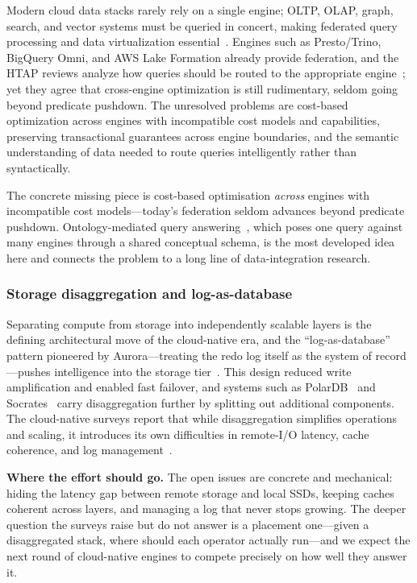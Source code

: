 \documentclass[a4paper,fleqn]{cas-sc}
\begin{document}
Modern cloud data stacks rarely rely on a single engine; OLTP, OLAP, graph, search, and vector systems must be queried in concert, making federated query processing and data virtualization essential~\cite{Haas2024HTAPSurvey,Sheng2025MQRLD}. Engines such as Presto/Trino, BigQuery Omni, and AWS Lake Formation already provide federation, and the HTAP reviews analyze how queries should be routed to the appropriate engine~\cite{Haas2024HTAPSurvey}; yet they agree that cross-engine optimization is still rudimentary, seldom going beyond predicate pushdown. The unresolved problems are cost-based optimization across engines with incompatible cost models and capabilities, preserving transactional guarantees across engine boundaries, and the semantic understanding of data needed to route queries intelligently rather than syntactically.

The concrete missing piece is cost-based optimisation \emph{across} engines with incompatible cost models---today's federation seldom advances beyond predicate pushdown. Ontology-mediated query answering~\cite{Xiao2018OBDA}, which poses one query against many engines through a shared conceptual schema, is the most developed idea here and connects the problem to a long line of data-integration research.

\subsubsection{Storage disaggregation and log-as-database}
\label{subsubsec:disaggregation}

Separating compute from storage into independently scalable layers is the defining architectural move of the cloud-native era, and the ``log-as-database'' pattern pioneered by Aurora---treating the redo log itself as the system of record---pushes intelligence into the storage tier~\cite{Verbitski2017,Li2024CloudNativeSurvey}. This design reduced write amplification and enabled fast failover, and systems such as PolarDB~\cite{Cao2021PolarDB} and Socrates~\cite{Antonopoulos2019} carry disaggregation further by splitting out additional components. The cloud-native surveys report that while disaggregation simplifies operations and scaling, it introduces its own difficulties in remote-I/O latency, cache coherence, and log management~\cite{Li2024CloudNativeSurvey}.

\textbf{Where the effort should go.} The open issues are concrete and mechanical: hiding the latency gap between remote storage and local SSDs, keeping caches coherent across layers, and managing a log that never stops growing. The deeper question the surveys raise but do not answer is a placement one---given a disaggregated stack, where should each operator actually run---and we expect the next round of cloud-native engines to compete precisely on how well they answer it.
\end{document}
